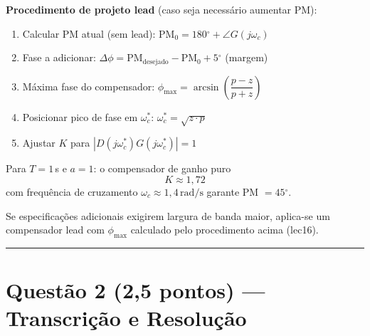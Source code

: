 \documentclass[12pt,a4paper]{article}
\newcommand{\degrees}{\ensuremath{^{\circ}}}
\begin{document}
\textbf{Procedimento de projeto lead} (caso seja necessário aumentar PM):

\begin{enumerate}
  \item Calcular PM atual (sem lead): $\text{PM}_0 = 180\degrees + \angle G(j\omega_c)$
  \item Fase a adicionar: $\Delta\phi = \text{PM}_{\text{desejado}} - \text{PM}_0 + 5\degrees$ (margem)
  \item Máxima fase do compensador: $\phi_{\max} = \arcsin\!\!\left(\dfrac{p-z}{p+z}\right)$
  \item Posicionar pico de fase em $\omega_c^*$: $\omega_c^* = \sqrt{z \cdot p}$
  \item Ajustar $K$ para $|D(j\omega_c^*) G(j\omega_c^*)| = 1$
\end{enumerate}

\begin{resposta}
Para $T = 1$\,s e $a = 1$: o compensador de ganho puro
\[
  \boxed{K \approx 1{,}72}
\]
com frequência de cruzamento $\omega_c \approx 1{,}4\,\text{rad/s}$ garante
PM $= 45\degrees$.

Se especificações adicionais exigirem largura de banda maior, aplica-se um
compensador lead com $\phi_{\max}$ calculado pelo procedimento acima (lec16).
\end{resposta}

\vspace{10pt}\hrule\vspace{10pt}

\section*{Questão 2 \normalfont\small(2{,}5 pontos) — Transcrição e Resolução}
\end{document}
